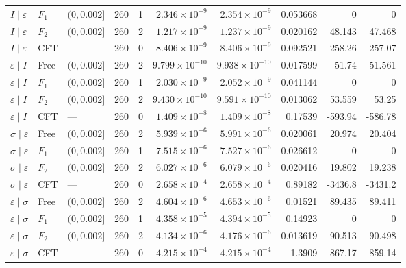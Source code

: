 \begin{longtable}{lllrrrrrrr}
$I\mid \varepsilon$ & $F_1$ & $(0,0.002]$ & 260 & 1 & $2.346\!\times\!10^{-9}$ & $2.354\!\times\!10^{-9}$ & 0.053668 & 0 & 0\\*
$I\mid \varepsilon$ & $F_2$ & $(0,0.002]$ & 260 & 2 & $1.217\!\times\!10^{-9}$ & $1.237\!\times\!10^{-9}$ & 0.020162 & 48.143 & 47.468\\*
$I\mid \varepsilon$ & CFT & --- & 260 & 0 & $8.406\!\times\!10^{-9}$ & $8.406\!\times\!10^{-9}$ & 0.092521 & -258.26 & -257.07\\
\midrule
$\varepsilon\mid I$ & Free & $(0,0.002]$ & 260 & 2 & $9.799\!\times\!10^{-10}$ & $9.938\!\times\!10^{-10}$ & 0.017599 & 51.74 & 51.561\\*
$\varepsilon\mid I$ & $F_1$ & $(0,0.002]$ & 260 & 1 & $2.030\!\times\!10^{-9}$ & $2.052\!\times\!10^{-9}$ & 0.041144 & 0 & 0\\*
$\varepsilon\mid I$ & $F_2$ & $(0,0.002]$ & 260 & 2 & $9.430\!\times\!10^{-10}$ & $9.591\!\times\!10^{-10}$ & 0.013062 & 53.559 & 53.25\\*
$\varepsilon\mid I$ & CFT & --- & 260 & 0 & $1.409\!\times\!10^{-8}$ & $1.409\!\times\!10^{-8}$ & 0.17539 & -593.94 & -586.78\\
\midrule
$\sigma\mid \varepsilon$ & Free & $(0,0.002]$ & 260 & 2 & $5.939\!\times\!10^{-6}$ & $5.991\!\times\!10^{-6}$ & 0.020061 & 20.974 & 20.404\\*
$\sigma\mid \varepsilon$ & $F_1$ & $(0,0.002]$ & 260 & 1 & $7.515\!\times\!10^{-6}$ & $7.527\!\times\!10^{-6}$ & 0.026612 & 0 & 0\\*
$\sigma\mid \varepsilon$ & $F_2$ & $(0,0.002]$ & 260 & 2 & $6.027\!\times\!10^{-6}$ & $6.079\!\times\!10^{-6}$ & 0.020416 & 19.802 & 19.238\\*
$\sigma\mid \varepsilon$ & CFT & --- & 260 & 0 & $2.658\!\times\!10^{-4}$ & $2.658\!\times\!10^{-4}$ & 0.89182 & -3436.8 & -3431.2\\
\midrule
$\varepsilon\mid \sigma$ & Free & $(0,0.002]$ & 260 & 2 & $4.604\!\times\!10^{-6}$ & $4.653\!\times\!10^{-6}$ & 0.01521 & 89.435 & 89.411\\*
$\varepsilon\mid \sigma$ & $F_1$ & $(0,0.002]$ & 260 & 1 & $4.358\!\times\!10^{-5}$ & $4.394\!\times\!10^{-5}$ & 0.14923 & 0 & 0\\*
$\varepsilon\mid \sigma$ & $F_2$ & $(0,0.002]$ & 260 & 2 & $4.134\!\times\!10^{-6}$ & $4.176\!\times\!10^{-6}$ & 0.013619 & 90.513 & 90.498\\*
$\varepsilon\mid \sigma$ & CFT & --- & 260 & 0 & $4.215\!\times\!10^{-4}$ & $4.215\!\times\!10^{-4}$ & 1.3909 & -867.17 & -859.14\\
\end{longtable}
\endgroup

